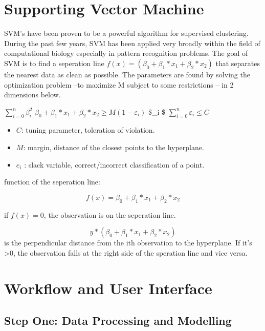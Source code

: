 \documentclass[10pt,letterpaper]{article}
\providecommand{\tightlist}{%
  \setlength{\itemsep}{0pt}\setlength{\parskip}{0pt}}
\begin{document}
\section{Supporting Vector Machine}\label{supporting-vector-machine}

SVM's have been proven to be a powerful algorithm for supervised
clustering. During the past few years, SVM has been applied very broadly
within the field of computational biology especially in pattern
recognition problems. The goal of SVM is to find a seperation line
\(f(x) = (\beta_0 + \beta_1 * x_1 + \beta_2 * x_2)\) that separates the
nearest data as clean as possible. The parameters \beta are found by
solving the optimization problem --to maximize M subject to some
restrictions -- in 2 dimensions below.

\(\sum_{i=0}^n \beta_{i}^2\)
\(\beta_0 + \beta_1 * x_1 + \beta_2 * x_2 \geq M(1-\varepsilon_i)\)
\$\varepsilon\_i  \$ \(\sum_{i=0}^n \varepsilon_i \leq C\)

\begin{itemize}
\tightlist
\item
  \(C\): tuning parameter, toleration of violation.
\item
  \(M\): margin, distance of the closest points to the hyperplane.
\item
  \(e_i\) : slack variable, correct/incorrect classification of a point.
\end{itemize}

function of the seperation line:

\[f(x) = \beta_0 + \beta_1 * x_1 + \beta_2 * x_2 \]

if \(f(x) = 0\), the observation is on the seperation line.

\[ y * ( \beta_0 + \beta_1 * x_1 + \beta_2 * x_2 )\] is the
perpendicular distance from the ith observation to the hyperplane. If
it's \textgreater{}0, the observation falls at the right side of the
speration line and vice versa.

\section{Workflow and User Interface}\label{workflow-and-user-interface}

\subsection{Step One: Data Processing and
Modelling}\label{step-one-data-processing-and-modelling}
\end{document}
